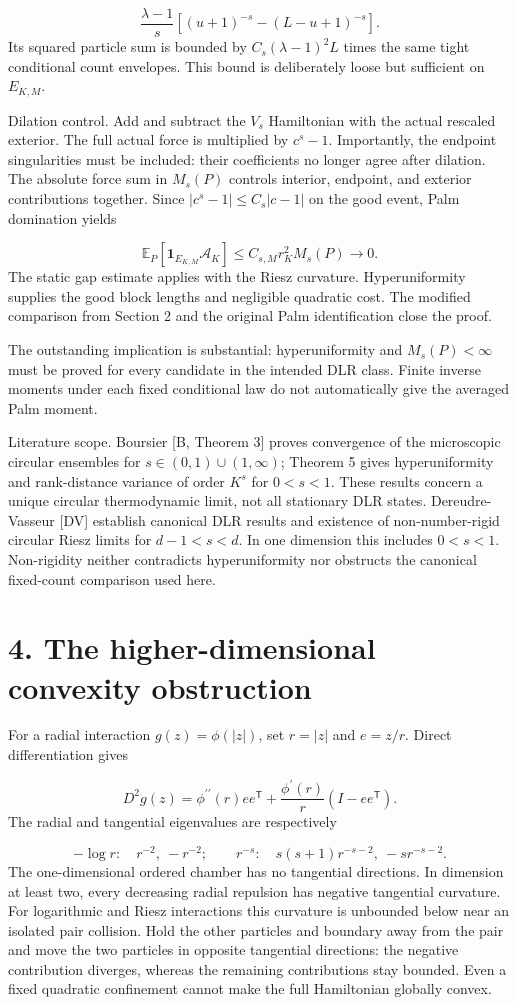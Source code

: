 \documentclass[11pt]{article}
\begin{document}
\[
\frac{\lambda-1}{s}\left[(u+1)^{-s}-(L-u+1)^{-s}\right].
\]
Its squared particle sum is bounded by $C_s(\lambda-1)^2L$ times the same tight conditional count envelopes. This bound is deliberately loose but sufficient on $E_{K,M}$.

Dilation control. Add and subtract the $V_s$ Hamiltonian with the actual rescaled exterior. The full actual force is multiplied by $c^s-1$. Importantly, the endpoint singularities must be included: their coefficients no longer agree after dilation. The absolute force sum in $M_s(P)$ controls interior, endpoint, and exterior contributions together. Since $|c^s-1|\leq C_s|c-1|$ on the good event, Palm domination yields

\[
\mathbb E_P[\mathbf 1_{E_{K,M}}\mathcal A_K]\leq C_{s,M}r_K^2M_s(P)\longrightarrow0.
\]
The static gap estimate applies with the Riesz curvature. Hyperuniformity supplies the good block lengths and negligible quadratic cost. The modified comparison from Section 2 and the original Palm identification close the proof.

The outstanding implication is substantial: hyperuniformity and $M_s(P)<\infty$ must be proved for every candidate in the intended DLR class. Finite inverse moments under each fixed conditional law do not automatically give the averaged Palm moment.

Literature scope. Boursier [B, Theorem 3] proves convergence of the microscopic circular ensembles for $s\in(0,1)\cup(1,\infty)$; Theorem 5 gives hyperuniformity and rank-distance variance of order $K^s$ for $0<s<1$. These results concern a unique circular thermodynamic limit, not all stationary DLR states. Dereudre-Vasseur [DV] establish canonical DLR results and existence of non-number-rigid circular Riesz limits for $d-1<s<d$. In one dimension this includes $0<s<1$. Non-rigidity neither contradicts hyperuniformity nor obstructs the canonical fixed-count comparison used here.

\section*{4. The higher-dimensional convexity obstruction}
For a radial interaction $g(z)=\phi(|z|)$, set $r=|z|$ and $e=z/r$. Direct differentiation gives

\[
D^2g(z)=\phi^{\prime\prime}(r)ee^{\mathsf T}+\frac{\phi^{\prime}(r)}{r}(I-ee^{\mathsf T}).
\]
The radial and tangential eigenvalues are respectively

\[
-\log r:\quad r^{-2},\ -r^{-2};\qquad r^{-s}:\quad s(s+1)r^{-s-2},\ -sr^{-s-2}.
\]
The one-dimensional ordered chamber has no tangential directions. In dimension at least two, every decreasing radial repulsion has negative tangential curvature. For logarithmic and Riesz interactions this curvature is unbounded below near an isolated pair collision. Hold the other particles and boundary away from the pair and move the two particles in opposite tangential directions: the negative contribution diverges, whereas the remaining contributions stay bounded. Even a fixed quadratic confinement cannot make the full Hamiltonian globally convex.
\end{document}
